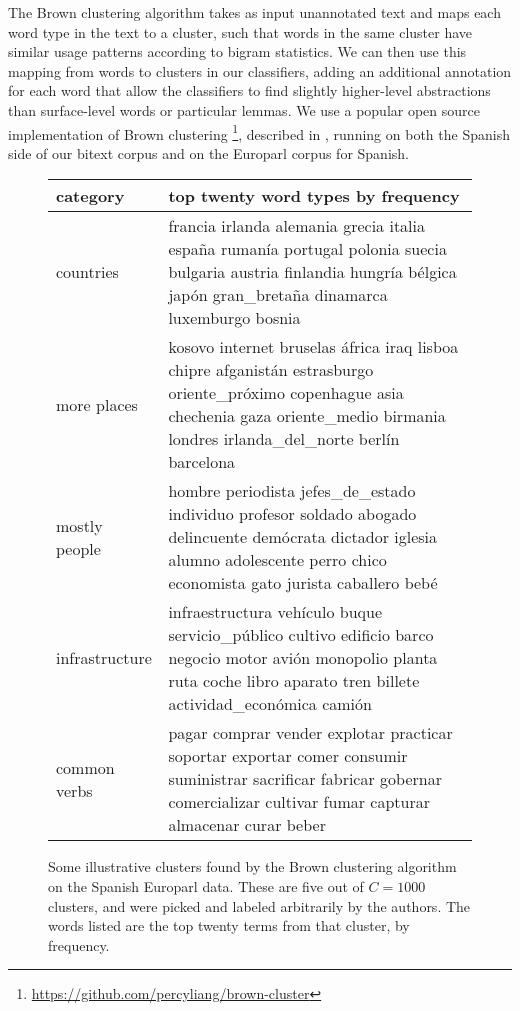 \documentclass[10pt, a4paper]{article}
\begin{document}
The Brown clustering algorithm takes as input unannotated text and maps each
word type in the text to a cluster, such that words in the same cluster have
similar usage patterns according to bigram statistics. We can then use this
mapping from words to clusters in our classifiers, adding an additional
annotation for each word that allow the classifiers to find slightly
higher-level abstractions than surface-level words or particular lemmas.
We use a popular open source implementation of Brown clustering
\footnote{\url{https://github.com/percyliang/brown-cluster}}, described in
\cite{Liang05semi-supervisedlearning}, running on both the Spanish side of our
bitext corpus and on the Europarl corpus for Spanish.

\begin{figure*}[t!]
  \begin{tabular}{|l|p{15cm}|}
    \hline
    category  & top twenty word types by frequency \\
    \hline
    countries & francia irlanda alemania grecia italia españa rumanía portugal polonia suecia bulgaria austria finlandia hungría bélgica japón gran\_bretaña dinamarca luxemburgo bosnia \\
    \hline
    more places & kosovo internet bruselas áfrica iraq lisboa chipre afganistán estrasburgo oriente\_próximo copenhague asia chechenia gaza oriente\_medio birmania londres irlanda\_del\_norte berlín barcelona \\
    \hline
    mostly people & hombre periodista jefes\_de\_estado individuo profesor soldado abogado delincuente demócrata dictador iglesia alumno adolescente perro chico economista gato jurista caballero bebé \\
    \hline
    infrastructure & infraestructura vehículo buque servicio\_público cultivo edificio barco negocio motor avión monopolio planta ruta coche libro aparato tren billete actividad\_económica camión \\
    \hline
    common verbs & pagar comprar vender explotar practicar soportar exportar comer consumir suministrar sacrificar fabricar gobernar comercializar cultivar fumar capturar almacenar curar beber \\
    \hline
  \end{tabular}
\caption{Some illustrative clusters found by the Brown clustering algorithm on
the Spanish Europarl data. These are five out of $C=1000$ clusters, and
were picked and labeled arbitrarily by the authors. The words listed are the
top twenty terms from that cluster, by frequency.}
\label{fig:clusters}
\end{figure*}
\end{document}
